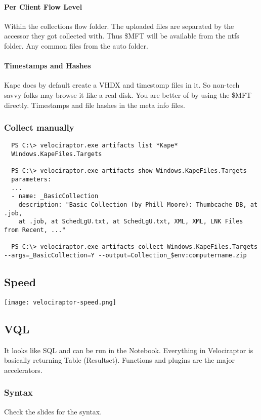 \paragraph{Per Client Flow Level}
Within the collections flow folder. The uploaded files are separated by the accessor they got collected with. Thus \$MFT will be available from the ntfs folder. Any common files from the auto folder.

\paragraph{Timestamps and Hashes}
Kape does by default create a VHDX and timestomp files in it. 
So non-tech savvy folks may browse it like a real disk. 
You are better of by using the \$MFT directly.
Timestamps and file hashes in the meta info files.

\subsubsection{Collect manually}
\begin{lstlisting}
  PS C:\> velociraptor.exe artifacts list *Kape*
  Windows.KapeFiles.Targets

  PS C:\> velociraptor.exe artifacts show Windows.KapeFiles.Targets
  parameters:
  ...
  - name: _BasicCollection
    description: "Basic Collection (by Phill Moore): Thumbcache DB, at .job,
    at .job, at SchedLgU.txt, at SchedLgU.txt, XML, XML, LNK Files from Recent, ..."

  PS C:\> velociraptor.exe artifacts collect Windows.KapeFiles.Targets --args=_BasicCollection=Y --output=Collection_$env:computername.zip
\end{lstlisting}

\subsection{Speed}
\texttt{[image: velociraptor-speed.png]}

\subsection{VQL}
It looks like SQL and can be run in the Notebook.
Everything in Velociraptor is basically returning Table (Resultset).
Functions and plugins are the major accelerators.

\subsubsection{Syntax}
Check the slides for the syntax.

